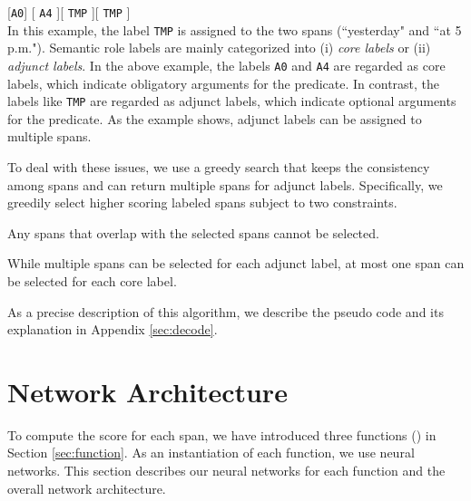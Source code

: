\documentclass[11pt,a4paper]{article}
\begin{document}
[{\tt A0}] \hspace{0.75cm} [\hspace{0.35cm} {\tt A4} \hspace{0.35cm}]\hspace{0.1cm}[\hspace{0.2cm} {\tt TMP} \hspace{0.2cm}]\hspace{0.1cm}[\hspace{0.1cm} {\tt TMP} \hspace{0.1cm}]\\

\vspace{-0.2cm}
\noindent
In this example, the label {\tt TMP} is assigned to the two spans (``yesterday" and ``at 5 p.m.").
Semantic role labels are mainly categorized into (i) {\it core labels} or (ii) {\it adjunct labels}.
In the above example, the labels {\tt A0} and {\tt A4} are regarded as core labels, which indicate obligatory arguments for the predicate.
In contrast, the labels like {\tt TMP} are regarded as adjunct labels, which indicate optional arguments for the predicate.
As the example shows, adjunct labels can be assigned to multiple spans.

To deal with these issues, we use a greedy search that keeps the consistency among spans and can return multiple spans for adjunct labels.
Specifically, we greedily select higher scoring labeled spans subject to two constraints.
\begin{description}
\setlength{\parskip}{0cm} 
\setlength{\itemsep}{0cm} 
\item[Overlap Constraint:] Any spans that overlap with the selected spans cannot be selected.
\item[Number Constraint:] While multiple spans can be selected for each adjunct label, at most one span can be selected for each core label.
\end{description}

\noindent
As a precise description of this algorithm, we describe the pseudo code and its explanation in Appendix \ref{sec:decode}. 

\section{Network Architecture}
\label{sec:network}
To compute the score for each span, we have introduced three functions () in Section \ref{sec:function}.
As an instantiation of each function, we use neural networks.
This section describes our neural networks for each function and the overall network architecture.
\end{document}
